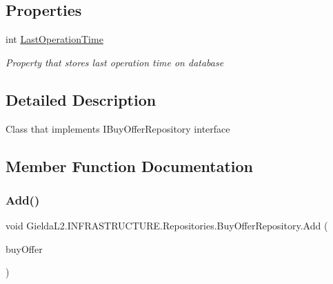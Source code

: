 \subsection*{Properties}
\begin{DoxyCompactItemize}
\item 
int \mbox{\hyperlink{class_gielda_l2_1_1_i_n_f_r_a_s_t_r_u_c_t_u_r_e_1_1_repositories_1_1_buy_offer_repository_aa2fa49c9bc8775391160b85ea09d0cda}{Last\+Operation\+Time}}
\begin{DoxyCompactList}\small\item\em Property that stores last operation time on database \end{DoxyCompactList}\end{DoxyCompactItemize}


\subsection{Detailed Description}
Class that implements I\+Buy\+Offer\+Repository interface 



\subsection{Member Function Documentation}
\mbox{\label{class_gielda_l2_1_1_i_n_f_r_a_s_t_r_u_c_t_u_r_e_1_1_repositories_1_1_buy_offer_repository_aeffc5aeab22da20ecaa887219079c5a1}} 
\subsubsection{\texorpdfstring{Add()}{Add()}}
{\footnotesize\ttfamily void Gielda\+L2.\+I\+N\+F\+R\+A\+S\+T\+R\+U\+C\+T\+U\+R\+E.\+Repositories.\+Buy\+Offer\+Repository.\+Add (\begin{DoxyParamCaption}\item[{\mbox{\hyperlink{class_gielda_l2_1_1_d_b_1_1_entities_1_1_buy_offer}{Buy\+Offer}}}]{buy\+Offer }\end{DoxyParamCaption})}



